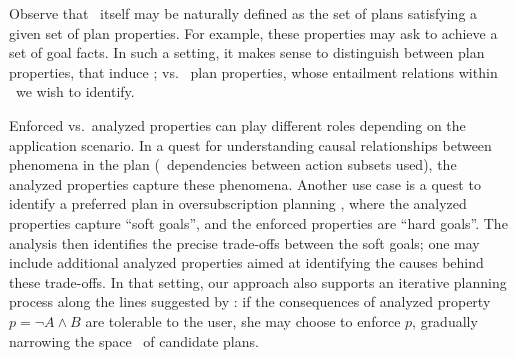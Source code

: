 Observe that \plans\ itself may be naturally defined as the set of
plans satisfying a given set of plan properties. For example, these
properties may ask to achieve a set of goal facts. In such a setting,
it makes sense to distinguish between  plan
properties, that induce \plans; vs.\  plan
properties, whose entailment relations within \plans\ we wish to
identify. 

Enforced vs.\ analyzed properties can play different roles depending
on the application scenario. In a quest for understanding causal
relationships between phenomena in the plan (\eg\ dependencies between
action subsets used), the analyzed properties capture these
phenomena. Another use case is a quest to identify a preferred plan in
oversubscription planning
\cite{smith:icaps-04,domshlak:mirkis:jair-15}, where the analyzed
properties capture ``soft goals'', and the enforced properties are
``hard goals''. The analysis then identifies the precise trade-offs
between the soft goals; one may include additional analyzed properties
aimed at identifying the causes behind these trade-offs. In that
setting, our approach also supports an iterative planning process
along the lines suggested by \cite{smith:aaai-12}: if the consequences
of analyzed property $p = \neg A \wedge B$ are tolerable to the user,
she may choose to enforce $p$, gradually narrowing the space
\plans\ of candidate plans. 


